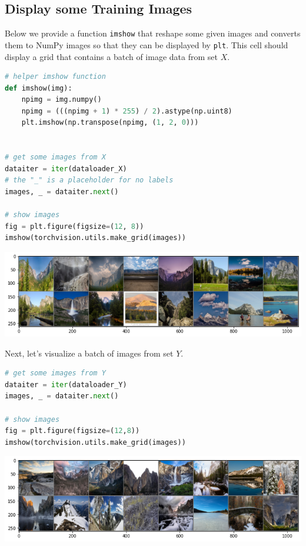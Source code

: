 \subsection{Display some Training Images}

Below we provide a function \lstinline{imshow} that
reshape some given images and converts them to NumPy images so that they
can be displayed by \lstinline{plt}. This cell should
display a grid that contains a batch of image data from set \(X\).

\begin{lstlisting}[language=Python]
# helper imshow function
def imshow(img):
    npimg = img.numpy()
    npimg = (((npimg + 1) * 255) / 2).astype(np.uint8)
    plt.imshow(np.transpose(npimg, (1, 2, 0)))
    

# get some images from X
dataiter = iter(dataloader_X)
# the "_" is a placeholder for no labels
images, _ = dataiter.next()

# show images
fig = plt.figure(figsize=(12, 8))
imshow(torchvision.utils.make_grid(images))
\end{lstlisting}

\includegraphics{img//genAdvNet//image2image/output_8_0.png}

Next, let's visualize a batch of images from set \(Y\).

\begin{lstlisting}[language=Python]
# get some images from Y
dataiter = iter(dataloader_Y)
images, _ = dataiter.next()

# show images
fig = plt.figure(figsize=(12,8))
imshow(torchvision.utils.make_grid(images))
\end{lstlisting}

\includegraphics{img//genAdvNet//image2image/output_10_0.png}

